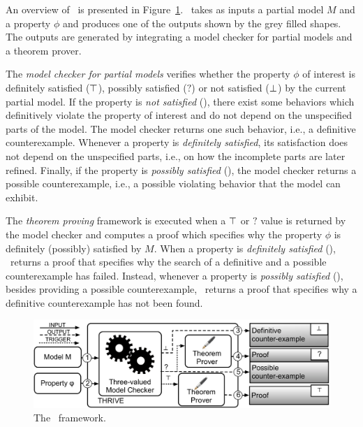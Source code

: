 An overview of \NAME\ is presented in Figure~\ref{Fig.3vdv}.
\NAME\ takes as inputs a partial model $M$ and  a property $\phi$ and produces one of the outputs shown by the grey filled shapes.
The outputs are generated by integrating a model checker for partial models and a theorem prover.





The \emph{model checker for partial models} verifies whether the property $\phi$ of interest is definitely satisfied ($\operatorname{\top}$), possibly satisfied ($?$) or not satisfied ($\operatorname{\bot}$) by the current partial model. 
If the property is \emph{not satisfied} (), there exist some behaviors which definitively violate the property of interest and do not depend on the unspecified parts of the model.
The model checker returns one such behavior, i.e., a definitive counterexample. 
Whenever a property is \emph{definitely satisfied}, its satisfaction does not depend on the unspecified parts, i.e., on how the incomplete parts are later refined.
Finally, if the property is \emph{possibly satisfied} (), the model checker returns a possible counterexample, i.e., a possible violating behavior that the model can exhibit.



The \emph{theorem proving} framework is executed when a $\operatorname{\top}$ or $?$ value is returned by the model checker and computes a proof which specifies why the property $\phi$ is definitely (possibly) satisfied by $M$.
When a property is \emph{definitely satisfied} (), \NAME\ returns a proof that specifies why the search of a definitive and a possible counterexample has failed. 
Instead, whenever a property is \emph{possibly satisfied} (), besides providing a possible counterexample, \NAME\ returns a proof that specifies why a definitive counterexample has not been found.



\begin{figure}[t]
\begin{center}         
\includegraphics[width=\linewidth]{./images/atvaFig.pdf}
\end{center}
\caption{The \NAME\ framework.}  
\label{Fig.3vdv}
\end{figure}








